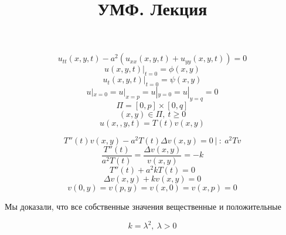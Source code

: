 \documentclass[a4paper]{article}
\begin{document}
\title{УМФ. Лекция}
\maketitle

\begin{equation}
    u_{tt}(x,y,t) - a^2 (u_{xx}(x,y,t) + u_{y y}(x,y,t)) = 0
    \label{eq:1}
\end{equation}
\begin{equation}
    u(x,y,t) |_{t = 0} = \phi(x,y)
    \label{eq:2}
\end{equation}
\begin{equation}
    u_t(x,y,t) |_{t = 0} = \psi(x,y)
    \label{eq:3}
\end{equation}
\begin{equation}
    u|_{x=0} = u|_{x=p} = u|_{y=0} = u|_{y=q} = 0
    \label{eq:4}
\end{equation}
\[
    \Pi = [0, p] \times [0, q]
\]
\[
    (x,y) \in \Pi, \ t \geq 0
\]
\begin{equation}
    u(x,,y,t) = T(t) v(x,y)
    \label{eq:5}
\end{equation}

\[
    T''(t) v(x,y) - a^2 T(t) \Delta v(x,y) = 0 \ | \ : \ a^2 Tv
\]
\[
    \frac{T''(t)}{a^2 T(t)} = \frac{\Delta v(x,y)}{v(x,y)} = -k 
\]
\begin{equation}
    T''(t) + a^2 k T(t) = 0
    \label{eq:6}
\end{equation}
\begin{equation}
    \Delta v(x,y) + k v(x,y) = 0
    \label{eq:7}
\end{equation}
\begin{equation}
    v(0,y) = v(p,y) = v(x,0) = v(x,p) = 0
    \label{eq:8}
\end{equation}

Мы доказали, что все собственные значения вещественные и положительные

\[
    k = \lambda^2, \ \lambda > 0
\]
\end{document}
